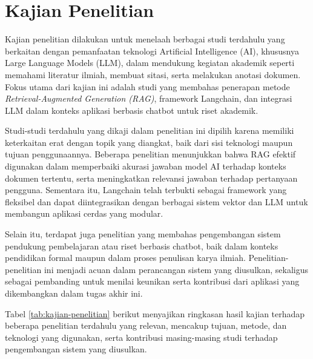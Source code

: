 \section{Kajian Penelitian}

Kajian penelitian dilakukan untuk menelaah berbagai studi terdahulu yang berkaitan dengan pemanfaatan teknologi Artificial Intelligence (AI), khususnya Large Language Models (LLM), dalam mendukung kegiatan akademik seperti memahami literatur ilmiah, membuat sitasi, serta melakukan anotasi dokumen. Fokus utama dari kajian ini adalah studi yang membahas penerapan metode \textit{Retrieval-Augmented Generation (RAG)}, framework Langchain, dan integrasi LLM dalam konteks aplikasi berbasis chatbot untuk riset akademik.

\singlespacing
Studi-studi terdahulu yang dikaji dalam penelitian ini dipilih karena memiliki keterkaitan erat dengan topik yang diangkat, baik dari sisi teknologi maupun tujuan penggunaannya. Beberapa penelitian menunjukkan bahwa RAG efektif digunakan dalam memperbaiki akurasi jawaban model AI terhadap konteks dokumen tertentu, serta meningkatkan relevansi jawaban terhadap pertanyaan pengguna. Sementara itu, Langchain telah terbukti sebagai framework yang fleksibel dan dapat diintegrasikan dengan berbagai sistem vektor dan LLM untuk membangun aplikasi cerdas yang modular.

Selain itu, terdapat juga penelitian yang membahas pengembangan sistem pendukung pembelajaran atau riset berbasis chatbot, baik dalam konteks pendidikan formal maupun dalam proses penulisan karya ilmiah. Penelitian-penelitian ini menjadi acuan dalam perancangan sistem yang diusulkan, sekaligus sebagai pembanding untuk menilai keunikan serta kontribusi dari aplikasi yang dikembangkan dalam tugas akhir ini.

\vspace{10pt}

Tabel \ref{tab:kajian-penelitian} berikut menyajikan ringkasan hasil kajian terhadap beberapa penelitian terdahulu yang relevan, mencakup tujuan, metode, dan teknologi yang digunakan, serta kontribusi masing-masing studi terhadap pengembangan sistem yang diusulkan.

\vspace{-10pt}

